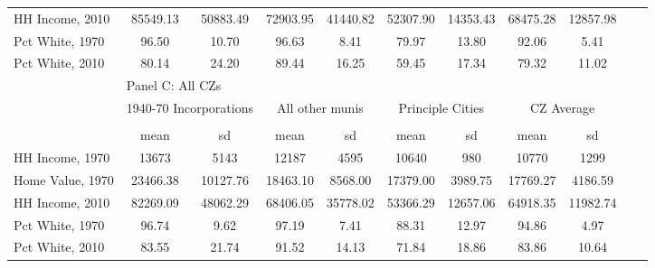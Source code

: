 \begin{tabular}{l*{10}{c}}
HH Income, 2010     &    85549.13&    50883.49&    72903.95&    41440.82&    52307.90&    14353.43&    68475.28&    12857.98\\
Pct White, 1970     &       96.50&       10.70&       96.63&        8.41&       79.97&       13.80&       92.06&        5.41\\
Pct White, 2010     &       80.14&       24.20&       89.44&       16.25&       59.45&       17.34&       79.32&       11.02\\
\toprule
&\multicolumn{8}{l}{Panel C: All CZs}\\
\cmidrule(lr){1-9}
&\multicolumn{2}{c}{1940-70 Incorporations}&\multicolumn{2}{c}{All other munis}&\multicolumn{2}{c}{Principle Cities}&\multicolumn{2}{c}{CZ Average}\\ \cmidrule(lr){2-3}  \cmidrule(lr){4-5} \cmidrule(lr){6-7} \cmidrule(lr){8-9}
                    &\multicolumn{2}{c}{}     &\multicolumn{2}{c}{}     &\multicolumn{2}{c}{}     &\multicolumn{2}{c}{}     \\
                    &        mean&          sd&        mean&          sd&        mean&          sd&        mean&          sd\\
\midrule
HH Income, 1970     &       13673&        5143&       12187&        4595&       10640&         980&       10770&        1299\\
Home Value, 1970    &    23466.38&    10127.76&    18463.10&     8568.00&    17379.00&     3989.75&    17769.27&     4186.59\\
HH Income, 2010     &    82269.09&    48062.29&    68406.05&    35778.02&    53366.29&    12657.06&    64918.35&    11982.74\\
Pct White, 1970     &       96.74&        9.62&       97.19&        7.41&       88.31&       12.97&       94.86&        4.97\\
Pct White, 2010     &       83.55&       21.74&       91.52&       14.13&       71.84&       18.86&       83.86&       10.64\\
\midrule \bottomrule \end{tabular}
